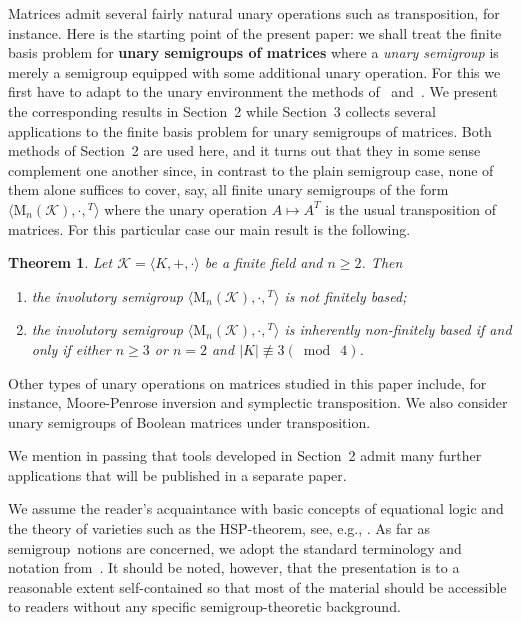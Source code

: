 \documentclass[11pt,reqno]{amsart}
\numberwithin{equation}{section}
\newtheorem{Thm}{Theorem}[section]
\theoremstyle{remark}
\def\sm{semi\-group}
\begin{document}
Matrices admit several fairly natural unary operations such as transposition, for instance. Here is the starting point
of the present paper: we shall treat the finite basis problem for \textbf{unary semigroups of matrices} where a
\emph{unary semigroup} is merely a semigroup equipped with some additional unary operation. For this we first have to
adapt to the unary environment the methods of~\cite{V} and~\cite{sapirburnside}. We present the corresponding results
in Section~2 while Section~3 collects several applications to the finite basis problem for unary semigroups of
matrices. Both methods of Section~2 are used here, and it turns out that they in some sense complement one another
since, in contrast to the plain semigroup case, none of them alone suffices to cover, say, all finite unary semigroups
of the form $\langle\mathrm{M}_n(\mathcal{K}),\cdot,{}^T\rangle$ where the unary operation $A\mapsto A^T$ is the usual
transposition of matrices. For this particular case our main result is the following.
\begin{Thm}\label{main result involution}
Let $\mathcal{K}=\langle K,+,\cdot\rangle$
be a finite field and $n\ge 2$. Then
\begin{enumerate}
\item the involutory semigroup $\langle \mathrm{M}_n(\mathcal{K}),\cdot,{}^T\rangle$
is not finitely based;
\item the involutory semigroup $\langle \mathrm{M}_n(\mathcal{K}),\cdot,{}^T\rangle$
is inherently non-finitely ba\-sed if and only if either $n\ge 3$ or $n=2$ and $\vert K\vert\mathrel{\not\equiv 3}
(\bmod\ 4)$.
\end{enumerate}
\end{Thm}
Other types of unary operations on matrices studied in this paper include, for instance, Moore-Penrose inversion and
symplectic transposition. We also consider unary semigroups of Boolean matrices under transposition.

We mention in passing that tools developed in Section~2 admit many further applications that will be published in a
separate paper.

We assume the reader's acquaintance with basic concepts of equational logic and the theory of varieties such as the
HSP-theorem, see, e.g., \cite[Chapter~II]{BuSa81}. As far as \sm\ notions are concerned, we adopt the standard
terminology and notation from~\cite{CP}. It should be noted, however, that the presentation is to a reasonable extent
self-contained so that most of the material  should be accessible to readers without any specific \sm-theoretic
background.
\end{document}
